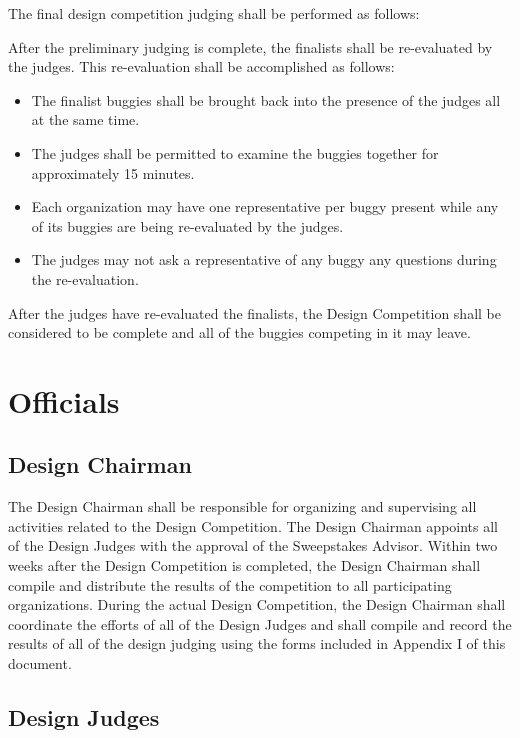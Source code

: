 	The final design competition judging shall be performed as follows:
	\newline

	After the preliminary judging is complete, the finalists shall be re-evaluated
	by the judges. This re-evaluation shall be accomplished as follows:

	\begin{itemize}
		\item The finalist buggies shall be brought back into the presence of the judges all at the same time.
		\item The judges shall be permitted to examine the buggies together for approximately 15 minutes.
		\item Each organization may have one representative per buggy present while any of its buggies are being re-evaluated by the judges.
		\item The judges may not ask a representative of any buggy any questions during the re-evaluation.
	\end{itemize}

	After the judges have re-evaluated the finalists, the Design Competition shall
	be considered to be complete and all of the buggies competing in it may leave.

\section{Officials}

\subsection{Design Chairman}

	The Design Chairman shall be responsible for organizing and supervising all
	activities related to the Design Competition. The Design Chairman appoints all
	of the Design Judges with the approval of the Sweepstakes Advisor. Within two
	weeks after the Design Competition is completed, the Design Chairman shall
	compile and distribute the results of the competition to all participating
	organizations. During the actual Design Competition, the Design Chairman shall
	coordinate the efforts of all of the Design Judges and shall compile and record
	the results of all of the design judging using the forms included in Appendix I
	of this document.

\subsection{Design Judges}

